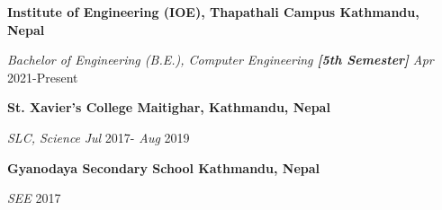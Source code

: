 \textbf{Institute of Engineering (IOE), Thapathali Campus \hfill Kathmandu, Nepal} \par
\textit{Bachelor of Engineering (B.E.), Computer Engineering \textbf{[5th Semester]}} \hfill \textit{Apr}  2021-Present\par

\textbf{St. Xavier's College \hfill Maitighar, Kathmandu, Nepal} \par
\textit{SLC, Science} \hfill \textit{Jul}  2017- \textit{Aug} 2019\par

\textbf{Gyanodaya Secondary School \hfill Kathmandu, Nepal} \par
\textit{SEE} \hfill 2017\par